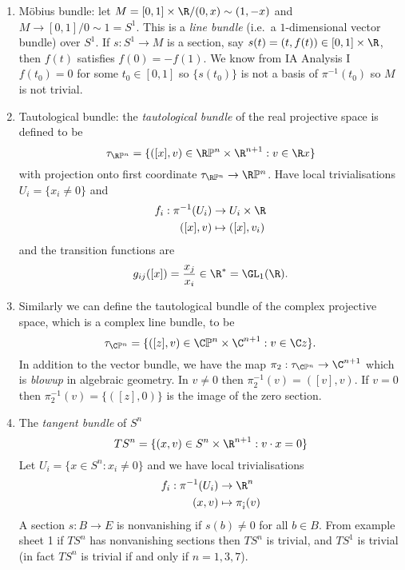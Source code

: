 \documentclass[a4paper]{article}
\renewcommand*{\P}{\mathbb{P}}
\begin{document}
\begin{eg}\leavevmode
  \begin{enumerate}
  \item Möbius bundle: let \(M = [0, 1] \times \R /(0, x) \sim (1, -x)\) and \(M \to [0, 1]/0 \sim 1 = S^1\). This is a \emph{line bundle} (i.e.\ a \(1\)-dimensional vector bundle) over \(S^1\). If \(s: S^1 \to M\) is a section, say \(s(t) = (t, f(t)) \in [0, 1] \times \R\), then \(f(t)\) satisfies \(f(0) = -f(1)\). We know from IA Analysis I \(f(t_0) = 0\) for some \(t_0 \in [0, 1]\) so \(\{s(t_0)\}\) is not a basis of \(\pi^{-1}(t_0)\) so \(M\) is not trivial.
  \item Tautological bundle: the \emph{tautological bundle} of the real projective space is defined to be
    \[
      \tau_{\R\P^n} = \{([x], v) \in \R\P^n \times \R^{n + 1}: v \in \R x\}
    \]
    with projection onto first coordinate \(\tau_{\R\P^n} \to \R\P^n\). Have local trivialisations \(U_i = \{x_i \neq 0\}\) and
    \begin{align*}
      f_i: \pi^{-1}(U_i) &\to U_i \times \R \\
      ([x], v) &\mapsto ([x], v_i)
    \end{align*}
    and the transition functions are
    \[
      g_{ij}([x]) = \frac{x_j}{x_i} \in \R^* = \GL_1(\R).
    \]
  \item Similarly we can define the tautological bundle of the complex projective space, which is a complex line bundle, to be
    \[
      \tau_{\C\P^n} = \{([z], v) \in \C\P^n \times \C^{n + 1}: v \in \C z\}.
    \]
    In addition to the vector bundle, we have the map \(\pi_2: \tau_{\C\P^n} \to \C^{n + 1}\) which is \emph{blowup} in algebraic geometry. In \(v \neq 0\) then \(\pi_2^{-1}(v) = ([v], v)\). If \(v = 0\) then \(\pi_2^{-1}(v) = \{([z], 0)\}\) is the image of the zero section.
  \item The \emph{tangent bundle} of \(S^n\)
    \[
      TS^n = \{(x, v) \in S^n \times \R^{n + 1}: v \cdot x = 0\}
    \]
    Let \(U_i = \{x \in S^n: x_i \neq 0\}\) and we have local trivialisations
    \begin{align*}
      f_i: \pi^{-1}(U_i) &\to \R^n \\
      (x, v) &\mapsto \pi_{\hat i}(v)
    \end{align*}
    A section \(s: B \to E\) is nonvanishing if \(s(b) \neq 0\) for all \(b \in B\). From example sheet 1 if \(TS^n\) has nonvanishing sections then \(TS^n\) is trivial, and \(TS^1\) is trivial (in fact \(TS^n\) is trivial if and only if \(n = 1, 3, 7\)).

\end{enumerate}
\end{eg}
\end{document}
